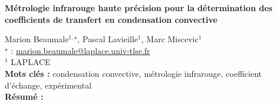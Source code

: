 


    \newpage


%
\begin{flushleft}
\addtocounter{section}{1}
{\Large \textbf{Métrologie infrarouge haute précision pour la détermination des coefficients de transfert en condensation convective}}\label{ref:71}
\end{flushleft}
%
Marion Beaumale$^{1,\star}$, Pascal Lavieille$^{1}$, Marc Miscevic$^{1}$\\[2mm]
$^{\star}$ \Letter : \url{marion.beaumale@laplace.univ-tlse.fr}\\[2mm]
{\footnotesize $^{1}$ LAPLACE}\\
[4mm]
%
\noindent \textbf{Mots clés : } condensation convective, métrologie infrarouge, coefficient d'échange, expérimental\\[4mm]
%
\noindent \textbf{Résumé : } 

